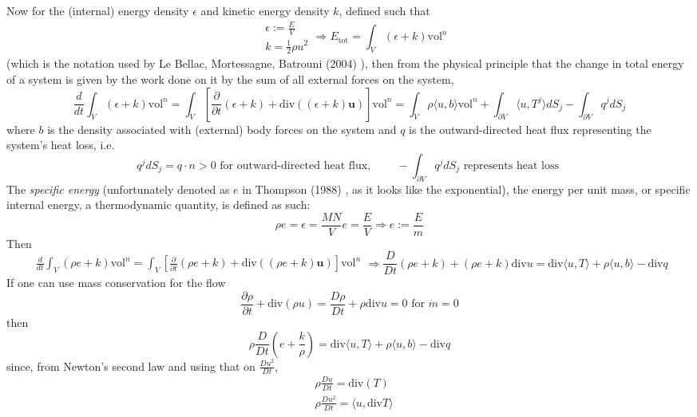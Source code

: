 \documentclass[10pt]{amsart}
\begin{document}
\begin{multicols*}{2}
Now for the (internal) energy density $\epsilon$ and kinetic energy density $k$, defined such that 
\[
\begin{aligned}
  & \epsilon := \frac{E}{V} \\ 
  & k = \frac{1}{2} \rho u^2
\end{aligned} \Longrightarrow E_{\text{tot}} = \int_V (\epsilon +k) \text{vol}^n
\]
(which is the notation used by Le Bellac, Mortessagne, Batrouni (2004) \cite{MLeBellacFMortessagneGBatrouni2004}), then from the physical principle that the change in total energy of a system is given by the work done on it by the sum of all external forces on the system,
\[
\frac{d}{dt} \int_V (\epsilon + k) \text{vol}^n = \int_V \left[ \frac{ \partial }{ \partial t}( \epsilon + k) + \text{div}((\epsilon +k)\mathbf{u} ) \right] \text{vol}^n = \int_V \rho \langle u,b\rangle \text{vol}^n + \int_{\partial V} \langle u , T^j \rangle dS_j - \int_{\partial V} q^j dS_j
\]
where $b$ is the density associated with (external) body forces on the system and $q$ is the outward-directed heat flux representing the system's heat loss, i.e.
\[
q^j dS_j = q\cdot n > 0 \text{ for outward-directed heat flux, } \qquad -\int_{\partial V} q^j dS_j \text{ represents heat loss }
\]
The \emph{specific energy} (unfortunately denoted as $e$ in Thompson (1988) \cite{PThompson1988}, as it looks like the exponential), the energy per unit mass, or specific internal energy, a thermodynamic quantity, is defined as such:
\[
\rho e = \epsilon = \frac{MN}{V} e = \frac{E}{V} \Longrightarrow e:= \frac{E}{m}
\]
Then
\[
\begin{gathered}
  \frac{d}{dt} \int_V (\rho e + k ) \text{vol}^n = \int_V \left[ \frac{ \partial }{ \partial t} (\rho e + k) + \text{div}((\rho e + k)\mathbf{u}) \right] \text{vol}^n
\end{gathered} \Longrightarrow \frac{D}{Dt}(\rho e + k) + (\rho e+k) \text{div}u = \text{div}\langle u, T \rangle + \rho \langle u, b\rangle - \text{div} q
\]
If one can use mass conservation for the flow
\[
\frac{ \partial \rho }{ \partial t} + \text{div}(\rho u) = \frac{D\rho }{ D t} + \rho \text{div}u = 0 \text{ for } \dot{m}=0
\]
then
\[
\rho \frac{D}{Dt}( e + \frac{k}{\rho } ) = \text{div}\langle u, T \rangle + \rho \langle u,b\rangle - \text{div}q
\]
since, from Newton's second law and using that on $\frac{Du^2}{Dt}$, 
\[
\begin{aligned}
  & \rho \frac{Du}{Dt} = \text{div}(T) \\
  & \rho \frac{Du^2}{Dt} = \langle u,\text{div}T \rangle
\end{aligned}
\]
\end{multicols*}
\end{document}
